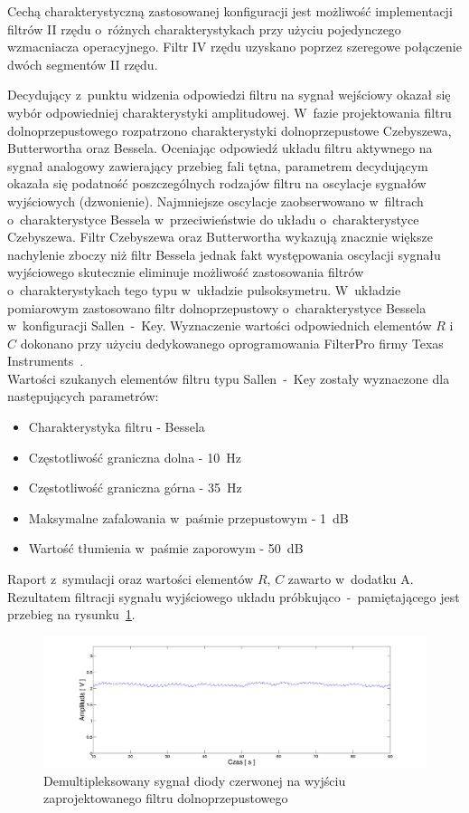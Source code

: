 Cechą charakterystyczną zastosowanej konfiguracji jest możliwość implementacji filtrów II rzędu o~różnych charakterystykach przy użyciu pojedynczego wzmacniacza operacyjnego. Filtr IV rzędu uzyskano poprzez 
szeregowe połączenie dwóch segmentów II rzędu. 

Decydujący z~punktu widzenia odpowiedzi filtru na sygnał wejściowy okazał się wybór odpowiedniej charakterystyki amplitudowej. W~fazie projektowania filtru dolnoprzepustowego rozpatrzono charakterystyki 
dolnoprzepustowe Czebyszewa, Butterwortha oraz Bessela. Oceniając odpowiedź układu filtru aktywnego na sygnał analogowy zawierający przebieg fali tętna, parametrem decydującym okazała się podatność poszczególnych 
rodzajów filtru na oscylacje sygnałów wyjściowych (dzwonienie).
Najmniejsze oscylacje zaobserwowano w~filtrach o~charakterystyce Bessela w~przeciwieństwie do układu o~charakterystyce Czebyszewa. Filtr Czebyszewa oraz Butterwortha wykazują znacznie większe nachylenie zboczy 
niż filtr Bessela jednak fakt występowania oscylacji sygnału wyjściowego skutecznie eliminuje możliwość zastosowania filtrów o~charakterystykach tego typu w~układzie pulsoksymetru.
W~układzie pomiarowym zastosowano filtr dolnoprzepustowy o~charakterystyce Bessela w~konfiguracji Sallen~-~Key. Wyznaczenie wartości odpowiednich elementów $R$ i~$C$ dokonano przy użyciu dedykowanego 
oprogramowania FilterPro firmy Texas Instruments~\cite{TI}.\\

Wartości szukanych elementów filtru typu Sallen~-~Key zostały wyznaczone dla następujących parametrów:
\begin{itemize}
	\item Charakterystyka filtru - Bessela
	\item Częstotliwość graniczna dolna - 10~Hz
	\item Częstotliwość graniczna górna - 35~Hz
	\item Maksymalne zafalowania w~paśmie przepustowym - 1~dB
	\item Wartość tłumienia w~paśmie zaporowym - 50~dB
\end{itemize}
\noindent Raport z~symulacji oraz wartości elementów $R$, $C$ zawarto w~dodatku A.\\

Rezultatem filtracji sygnału wyjściowego układu próbkująco~-~pamiętającego jest przebieg na rysunku~\ref{rys:filtr2}.
\begin{figure}[!ht]
	\centerline{\includegraphics[scale = 0.38]{graphic/filtr2}}
	\caption{Demultipleksowany sygnał diody czerwonej na wyjściu zaprojektowanego filtru dolnoprzepustowego}
	\label{rys:filtr2}
\end{figure}

